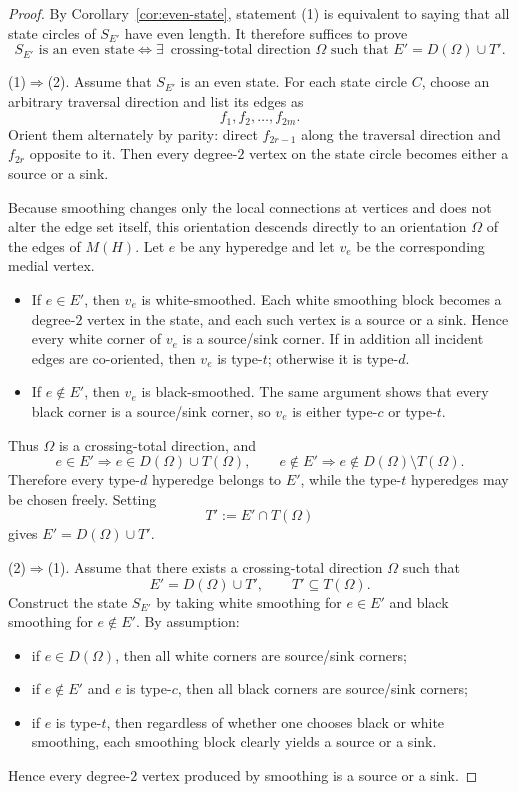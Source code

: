 \documentclass{article}
\begin{document}
\begin{proof}
By Corollary~\ref{cor:even-state}, statement (1) is equivalent to saying that all state circles of $S_{E'}$ have even length. It therefore suffices to prove
\[
S_{E'}\text{ is an even state}
\Longleftrightarrow
\exists\,\text{ crossing-total direction $\Omega$ such that }E'=D(\Omega)\cup T'.
\]

\noindent(1)$\Rightarrow$(2). Assume that $S_{E'}$ is an even state. For each state circle $C$, choose an arbitrary traversal direction and list its edges as
\[
f_1,f_2,\dots,f_{2m}.
\]
Orient them alternately by parity: direct $f_{2r-1}$ along the traversal direction and $f_{2r}$ opposite to it. Then every degree-$2$ vertex on the state circle becomes either a source or a sink.

Because smoothing changes only the local connections at vertices and does not alter the edge set itself, this orientation descends directly to an orientation $\Omega$ of the edges of $M(H)$. Let $e$ be any hyperedge and let $v_e$ be the corresponding medial vertex.
\begin{itemize}
  \item If $e\in E'$, then $v_e$ is white-smoothed. Each white smoothing block becomes a degree-$2$ vertex in the state, and each such vertex is a source or a sink. Hence every white corner of $v_e$ is a source/sink corner. If in addition all incident edges are co-oriented, then $v_e$ is type-$t$; otherwise it is type-$d$.
  \item If $e\notin E'$, then $v_e$ is black-smoothed. The same argument shows that every black corner is a source/sink corner, so $v_e$ is either type-$c$ or type-$t$.
\end{itemize}
Thus $\Omega$ is a crossing-total direction, and
\[
e\in E'\Rightarrow e\in D(\Omega)\cup T(\Omega),
\qquad
e\notin E'\Rightarrow e\notin D(\Omega)\setminus T(\Omega).
\]
Therefore every type-$d$ hyperedge belongs to $E'$, while the type-$t$ hyperedges may be chosen freely. Setting
\[
T':=E'\cap T(\Omega)
\]
gives $E'=D(\Omega)\cup T'$.

\noindent(2)$\Rightarrow$(1). Assume that there exists a crossing-total direction $\Omega$ such that
\[
E'=D(\Omega)\cup T',\qquad T'\subseteq T(\Omega).
\]
Construct the state $S_{E'}$ by taking white smoothing for $e\in E'$ and black smoothing for $e\notin E'$. By assumption:
\begin{itemize}
  \item if $e\in D(\Omega)$, then all white corners are source/sink corners;
  \item if $e\notin E'$ and $e$ is type-$c$, then all black corners are source/sink corners;
  \item if $e$ is type-$t$, then regardless of whether one chooses black or white smoothing, each smoothing block clearly yields a source or a sink.
\end{itemize}
Hence every degree-$2$ vertex produced by smoothing is a source or a sink.


\end{proof}
\end{document}
